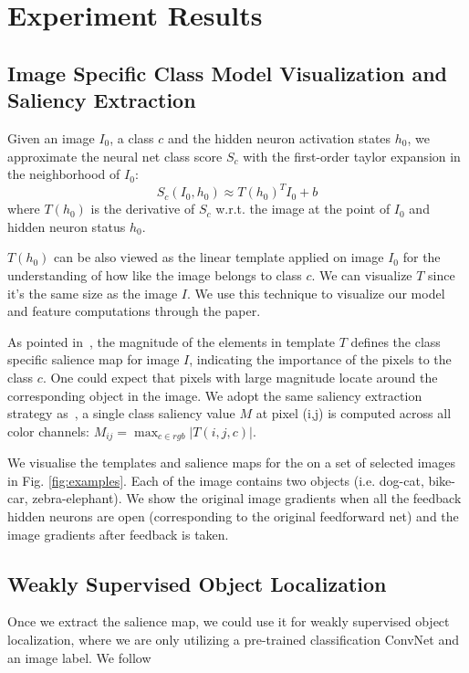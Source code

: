 \section{Experiment Results}
\label{sec:experiment}

\subsection{Image Specific Class Model Visualization and Saliency Extraction}
Given an image $I_0$, a class $c$ and the hidden neuron activation states $h_0$, we approximate the neural net class score $S_c$ with the first-order taylor expansion in the neighborhood of $I_0$:
\begin{equation}
  S_c(I_0, h_0) \approx  T(h_0)^T I_0 + b
\end{equation}
where $T(h_0)$ is the derivative of $S_c$ w.r.t. the image at the point of $I_0$ and hidden neuron status $h_0$.

$T(h_0)$ can be also viewed as the linear template applied on image $I_0$ for the understanding of how like the image belongs to class $c$. We can visualize $T$ since it's the same size as the image $I$. We use this technique to visualize our model and feature computations through the paper.

As pointed in~\cite{xxx}, the magnitude of the elements in template $T$ defines the class specific salience map for image $I$, indicating the importance of the pixels to the class $c$. One could expect that pixels with large magnitude locate around the corresponding object in the image. We adopt the same saliency extraction strategy as~\cite{xxx}, a single class saliency value $M$ at pixel (i,j) is computed across all color channels: $M_{ij} = \max_{c \in rgb} | T(i,j,c) |$.

We visualise the templates and salience maps for the  on a set of selected images in Fig. \ref{fig:examples}. Each of the image contains two objects (i.e. dog-cat, bike-car, zebra-elephant). We show the original image gradients when all the feedback hidden neurons are open (corresponding to the original feedforward net) and the image gradients after feedback is taken.

\subsection{Weakly Supervised Object Localization}
Once we extract the salience map, we could use it for weakly supervised object localization, where we are only utilizing a pre-trained classification ConvNet and an image label. We follow~\cite{xxx}

